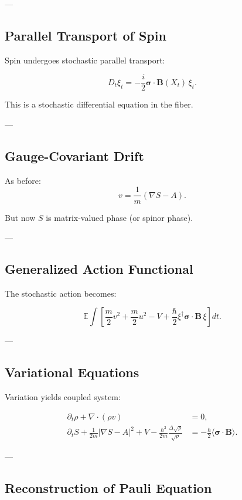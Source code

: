 ---

\subsection{Parallel Transport of Spin}

Spin undergoes stochastic parallel transport:

\[
D_t \xi_t = -\frac{i}{2} \bm{\sigma}\cdot \bm{B}(X_t)\, \xi_t.
\]

This is a stochastic differential equation in the fiber.

---

\subsection{Gauge-Covariant Drift}

As before:
\[
v = \frac{1}{m}(\nabla S - A).
\]

But now $S$ is matrix-valued phase (or spinor phase).

---

\subsection{Generalized Action Functional}

The stochastic action becomes:

\[
\mathbb{E} \int
\left[
\frac{m}{2}v^2 + \frac{m}{2}u^2
- V
+ \frac{\hbar}{2} \xi^\dagger \bm{\sigma}\cdot \bm{B} \,\xi
\right] dt.
\]

---

\subsection{Variational Equations}

Variation yields coupled system:

\begin{align}
\partial_t \rho + \nabla\cdot(\rho v) &= 0, \\
\partial_t S + \frac{1}{2m}|\nabla S - A|^2 + V
- \frac{\hbar^2}{2m}\frac{\Delta \sqrt{\rho}}{\sqrt{\rho}}
&= -\frac{\hbar}{2}\langle \bm{\sigma}\cdot \bm{B}\rangle.
\end{align}

---

\subsection{Reconstruction of Pauli Equation}

